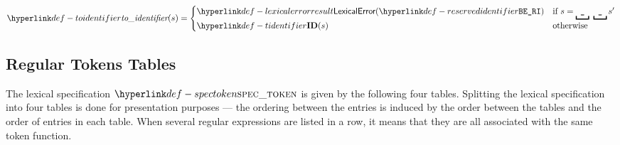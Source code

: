 \FormallyParagraph
\[
  \toidentifier(s) = \begin{cases}
    \LexicalErrorVal{\ReservedIdentifier} & \text{if }s = \underbracket{\texttt{ \_ } }\ \underbracket{\texttt{ \_ } } s'\\
    \Tidentifier(s) & \text{otherwise}
  \end{cases}
\]

\subsection{Regular Tokens Tables}

\hypertarget{def-spectoken}{}
The lexical specification  $\spectoken$ is given by the following four tables.
Splitting the lexical specification into four tables is done for presentation purposes ---
the ordering between the entries is induced by the order between the tables
and the order of entries in each table.
%
When several regular expressions are listed in a row, it means that they are all associated with the same
token function.

